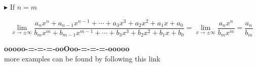\documentclass{ximera}
\begin{document}
\textbf{\textcolor{red!70!darkgray}{$\blacktriangleright$}} If $n = m$




\[  \lim\limits_{x \to \pm\infty} \frac{ a_n x^n + a_{n-1} x^{n-1} + \cdots + a_3 x^3 + a_2 x^2 + a_1 x + a_0  } { b_m x^m + b_{m-1} x^{m-1} + \cdots + b_3 x^3 + b_2 x^2 + b_1 x + b_0 }   =  \lim\limits_{x \to \pm\infty} \frac{ a_n x^n } { b_m x^m } = \frac{ a_n} { b_m }
\]














\begin{onlineOnly}
\begin{center}
\textbf{\textcolor{green!50!black}{ooooo-=-=-=-ooOoo-=-=-=-ooooo}} \\

more examples can be found by following this link\\ 

\end{center}
\end{onlineOnly}
\end{document}

